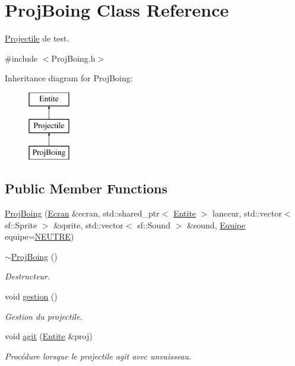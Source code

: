 \hypertarget{class_proj_boing}{}\section{Proj\+Boing Class Reference}
\label{class_proj_boing}


\mbox{\hyperlink{class_projectile}{Projectile}} de test.  




{\ttfamily \#include $<$Proj\+Boing.\+h$>$}

Inheritance diagram for Proj\+Boing\+:\begin{figure}[H]
\begin{center}
\leavevmode
\includegraphics[height=3.000000cm]{class_proj_boing}
\end{center}
\end{figure}
\subsection*{Public Member Functions}
\begin{DoxyCompactItemize}
\item 
\mbox{\hyperlink{class_proj_boing_a4470a575e57978e4941b5771f710d7f3}{Proj\+Boing}} (\mbox{\hyperlink{class_ecran}{Ecran}} \&ecran, std\+::shared\+\_\+ptr$<$ \mbox{\hyperlink{class_entite}{Entite}} $>$ lanceur, std\+::vector$<$ sf\+::\+Sprite $>$ \&sprite, std\+::vector$<$ sf\+::\+Sound $>$ \&sound, \mbox{\hyperlink{constantes_8h_a08fa5554288d5031a8f3bb83cc04ee83}{Equipe}} equipe=\mbox{\hyperlink{constantes_8h_a08fa5554288d5031a8f3bb83cc04ee83a31ad00d2974deb1103ea000de3bff57d}{N\+E\+U\+T\+RE}})
\item 
\mbox{\hyperlink{class_proj_boing_a3b5745800aa7ce95337b6e89f06d2d43}{$\sim$\+Proj\+Boing}} ()
\begin{DoxyCompactList}\small\item\em Destructeur. \end{DoxyCompactList}\item 
void \mbox{\hyperlink{class_proj_boing_ac0d11abb68efb90dba3529d2bf1ce4f2}{gestion}} ()
\begin{DoxyCompactList}\small\item\em Gestion du projectile. \end{DoxyCompactList}\item 
void \mbox{\hyperlink{class_proj_boing_acbee1a0aa00582682ce755e1b19d687a}{agit}} (\mbox{\hyperlink{class_entite}{Entite}} \&proj)
\begin{DoxyCompactList}\small\item\em Procédure lorsque le projectile agit avec unvaisseau. \end{DoxyCompactList}\end{DoxyCompactItemize}
